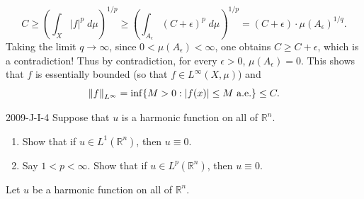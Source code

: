 \documentclass{article}
\begin{document}
	\begin{equation*}
		C \geq \left(\int_{X}|f|^p\;d\mu\right)^{1/p} \geq \left(\int_{A_{\epsilon}}(C + \epsilon)^p\;d\mu\right)^{1/p} = (C + \epsilon) \cdot \mu(A_{\epsilon})^{1/q}. 
	\end{equation*}
	Taking the limit $q \to \infty$, since $0 < \mu(A_{\epsilon}) < \infty$, one obtains $C \geq C + \epsilon$, which is a contradiction! Thus by contradiction, for every $\epsilon > 0$, $\mu(A_{\epsilon}) = 0$. This shows that $f$ is essentially bounded (so that $f \in L^\infty(X,\mu)$) and 
	\begin{equation*}
		\norm{f}_{L^\infty} = \inf\brac*{M > 0: |f(x)| \leq M \text{ a.e.}} \leq C. 
	\end{equation*}
	
	\begin{prb}{2009-J-I-4}
		Suppose that $u$ is a harmonic function on all of $\mathbb{R}^{n}$. \vspace{-0.25cm} 
		\begin{enumerate}[itemsep =-2pt,label = (\alph{*})]
			\item Show that if $u \in L^{1}(\mathbb{R}^{n})$, then $u \equiv 0$. 
			\item Say $1 < p < \infty$. Show that if $u \in L^{p}(\mathbb{R}^{n})$, then $u \equiv 0$. 
		\end{enumerate}
	\end{prb}
	Let $u$ be a harmonic function on all of $\mathbb{R}^{n}$. \vspace{-0.25cm}
\end{document}
